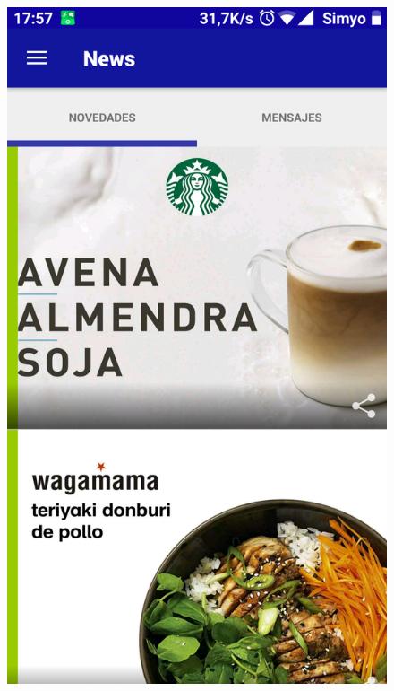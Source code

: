 \documentclass[twoside]{report}
\begin{document}
\begin{figure}[H]
\begin{center}
\includegraphics[scale=0.25]{images/restaurantes/vips1.png}

\end{center}
\end{figure}
\end{document}
